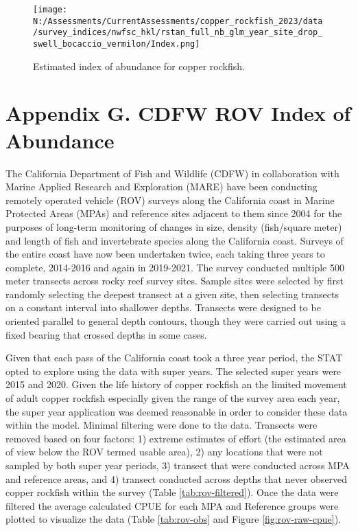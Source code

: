 \documentclass[11pt,
  english,
  letterpaper,
]{article}
\begin{document}
\newpage

\begin{figure}
\centering
\texttt{[image: N:/Assessments/CurrentAssessments/copper\_rockfish\_2023/data/survey\_indices/nwfsc\_hkl/rstan\_full\_nb\_glm\_year\_site\_drop\_swell\_bocaccio\_vermilon/Index.png]}
\caption{Estimated index of abundance for copper rockfish.\label{fig:nwfsc-hkl-indices}}
\end{figure}

\hypertarget{cdfw-rov-index}{%
\section{Appendix G. CDFW ROV Index of Abundance}\label{cdfw-rov-index}}

The California Department of Fish and Wildlife (CDFW) in collaboration with Marine Applied Research and Exploration (MARE) have been conducting remotely operated vehicle (ROV) surveys along the California coast in Marine Protected Areas (MPAs) and reference sites adjacent to them since 2004 for the purposes of long-term monitoring of changes in size, density (fish/square meter) and length of fish and invertebrate species along the California coast. Surveys of the entire coast have now been undertaken twice, each taking three years to complete, 2014-2016 and again in 2019-2021. The survey conducted multiple 500 meter transects across rocky reef survey sites. Sample sites were selected by first randomly selecting the deepest transect at a given site, then selecting transects on a constant interval into shallower depths. Transects were designed to be oriented parallel to general depth contours, though they were carried out using a fixed bearing that crossed depths in some cases.

Given that each pass of the California coast took a three year period, the STAT opted to explore using the data with super years. The selected super years were 2015 and 2020. Given the life history of copper rockfish an the limited movement of adult copper rockfish especially given the range of the survey area each year, the super year application was deemed reasonable in order to consider these data within the model. Minimal filtering were done to the data. Transects were removed based on four factors: 1) extreme estimates of effort (the estimated area of view below the ROV termed usable area), 2) any locations that were not sampled by both super year periods, 3) transect that were conducted across MPA and reference areas, and 4) transect conducted across depths that never observed copper rockfish within the survey (Table \ref{tab:rov-filtered}). Once the data were filtered the average calculated CPUE for each MPA and Reference groups were plotted to visualize the data (Table \ref{tab:rov-obs} and Figure \ref{fig:rov-raw-cpue}).
\end{document}
